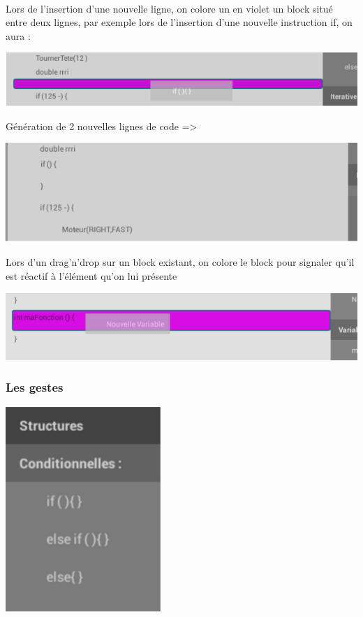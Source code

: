 \documentclass[a4paper]{article}
\begin{document}
\paragraph{}
Lors de l’insertion d’une nouvelle ligne, on colore un en violet un block situé entre deux lignes, par exemple lors de l’insertion d’une nouvelle instruction if, on aura :
\begin{center}
\includegraphics[scale=0.5]{img/edit_1.png}
\end{center}
Génération de 2 nouvelles lignes de code =>
\begin{center}
\includegraphics[scale=0.5]{img/edit_2.png}
\end{center}
Lors d’un drag'n'drop sur un block existant, on colore le block pour signaler qu’il est réactif à l’élément qu’on lui présente
\begin{center}
\includegraphics[scale=0.5]{img/edit_3.png}
\end{center}

\subsubsection{Les gestes}
\begin{center}
\includegraphics[scale=0.5]{img/gesture.png}
\end{center}
\end{document}
